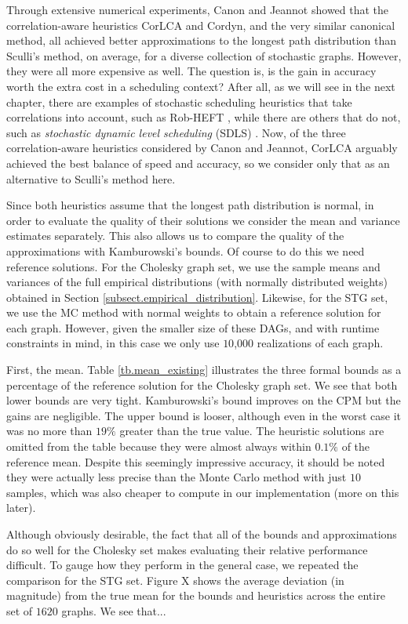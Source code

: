 \documentclass[12pt]{article}
\begin{document}
Through extensive numerical experiments, Canon and Jeannot showed that the correlation-aware heuristics CorLCA and Cordyn, and the very similar canonical method, all achieved better approximations to the longest path distribution than Sculli's method, on average, for a diverse collection of stochastic graphs. However, they were all more expensive as well. The question is, is the gain in accuracy worth the extra cost in a scheduling context? After all, as we will see in the next chapter, there are examples of stochastic scheduling heuristics that take correlations into account, such as Rob-HEFT \cite{can10}, while there are others that do not, such as {\em stochastic dynamic level scheduling} (SDLS) \cite{li15}. Now, of the three correlation-aware heuristics considered by Canon and Jeannot, CorLCA arguably achieved the best balance of speed and accuracy, so we consider only that as an alternative to Sculli's method here.

Since both heuristics assume that the longest path distribution is normal, in order to evaluate the quality of their solutions we consider the mean and variance estimates separately. This also allows us to compare the quality of the approximations with Kamburowski's bounds. Of course to do this we need reference solutions. For the Cholesky graph set, we use the sample means and variances of the full empirical distributions (with normally distributed weights) obtained in Section \ref{subsect.empirical_distribution}. Likewise, for the STG set, we use the MC method with normal weights to obtain a reference solution for each graph. However, given the smaller size of these DAGs, and with runtime constraints in mind, in this case we only use $10$,$000$ realizations of each graph.  

First, the mean. Table \ref{tb.mean_existing} illustrates the three formal bounds as a percentage of the reference solution for the Cholesky graph set. We see that both lower bounds are very tight. Kamburowski's bound improves on the CPM but the gains are negligible. The upper bound is looser, although even in the worst case it was no more than $19\%$ greater than the true value. The heuristic solutions are omitted from the table because they were almost always within $0.1\%$ of the reference mean. Despite this seemingly impressive accuracy, it should be noted they were actually less precise than the Monte Carlo method with just $10$ samples, which was also cheaper to compute in our implementation (more on this later).

Although obviously desirable, the fact that all of the bounds and approximations do so well for the Cholesky set makes evaluating their relative performance difficult. To gauge how they perform in the general case, we repeated the comparison for the STG set. Figure X shows the average deviation (in magnitude) from the true mean for the bounds and heuristics across the entire set of $1620$ graphs. We see that... 
\end{document}
